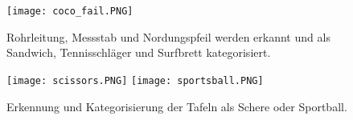 \begin{figure}[h!]
\centering
\texttt{[image: coco\_fail.PNG]}
\caption{Rohrleitung, Messstab und Nordungspfeil werden erkannt und als Sandwich, Tennisschläger und Surfbrett kategorisiert.}
\label{fig:coco}
\end{figure}
\begin{figure}[h!]
\texttt{[image: scissors.PNG]}
\texttt{[image: sportsball.PNG]}
\caption{Erkennung und Kategorisierung der Tafeln als Schere oder Sportball.}
\label{fig:cnnboard}
\end{figure}


